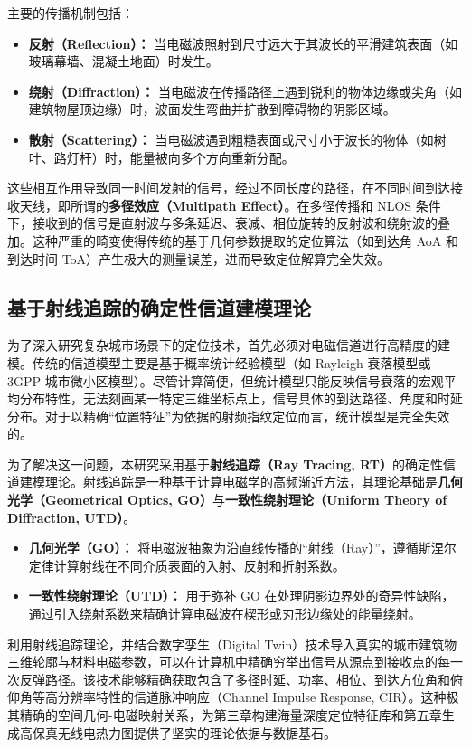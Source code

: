 主要的传播机制包括：
\begin{itemize}
    \item \textbf{反射（Reflection）：} 当电磁波照射到尺寸远大于其波长的平滑建筑表面（如玻璃幕墙、混凝土地面）时发生。
    \item \textbf{绕射（Diffraction）：} 当电磁波在传播路径上遇到锐利的物体边缘或尖角（如建筑物屋顶边缘）时，波面发生弯曲并扩散到障碍物的阴影区域。
    \item \textbf{散射（Scattering）：} 当电磁波遇到粗糙表面或尺寸小于波长的物体（如树叶、路灯杆）时，能量被向多个方向重新分配。
\end{itemize}

这些相互作用导致同一时间发射的信号，经过不同长度的路径，在不同时间到达接收天线，即所谓的\textbf{多径效应（Multipath Effect）}。在多径传播和 NLOS 条件下，接收到的信号是直射波与多条延迟、衰减、相位旋转的反射波和绕射波的叠加。这种严重的畸变使得传统的基于几何参数提取的定位算法（如到达角 AoA 和到达时间 ToA）产生极大的测量误差，进而导致定位解算完全失效。

\subsection{基于射线追踪的确定性信道建模理论}

为了深入研究复杂城市场景下的定位技术，首先必须对电磁信道进行高精度的建模。传统的信道模型主要是基于概率统计经验模型（如 Rayleigh 衰落模型或 3GPP 城市微小区模型）。尽管计算简便，但统计模型只能反映信号衰落的宏观平均分布特性，无法刻画某一特定三维坐标点上，信号具体的到达路径、角度和时延分布。对于以精确“位置特征”为依据的射频指纹定位而言，统计模型是完全失效的。

为了解决这一问题，本研究采用基于\textbf{射线追踪（Ray Tracing, RT）}的确定性信道建模理论。射线追踪是一种基于计算电磁学的高频渐近方法，其理论基础是\textbf{几何光学（Geometrical Optics, GO）}与\textbf{一致性绕射理论（Uniform Theory of Diffraction, UTD）}。
\begin{itemize}
    \item \textbf{几何光学（GO）：} 将电磁波抽象为沿直线传播的“射线（Ray）”，遵循斯涅尔定律计算射线在不同介质表面的入射、反射和折射系数。
    \item \textbf{一致性绕射理论（UTD）：} 用于弥补 GO 在处理阴影边界处的奇异性缺陷，通过引入绕射系数来精确计算电磁波在楔形或刃形边缘处的能量绕射。
\end{itemize}

利用射线追踪理论，并结合数字孪生（Digital Twin）技术导入真实的城市建筑物三维轮廓与材料电磁参数，可以在计算机中精确穷举出信号从源点到接收点的每一次反弹路径。该技术能够精确获取包含了多径时延、功率、相位、到达方位角和俯仰角等高分辨率特性的信道脉冲响应（Channel Impulse Response, CIR）。这种极其精确的空间几何-电磁映射关系，为第三章构建海量深度定位特征库和第五章生成高保真无线电热力图提供了坚实的理论依据与数据基石。


